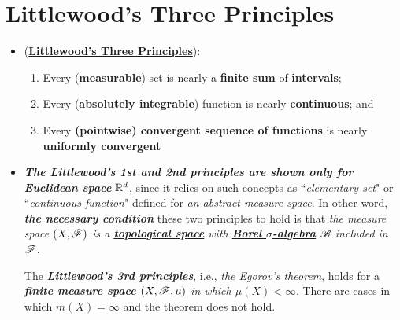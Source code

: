 \documentclass[11pt]{article}
\begin{document}
\newpage
\section{Littlewood's Three Principles}
\begin{itemize}
\item \begin{theorem} (\underline{\textbf{Littlewood's Three Principles}})\citep{royden1988real, tao2011introduction}:
\begin{enumerate}
\item Every (\textbf{measurable}) set is nearly a \textbf{finite sum} of \textbf{intervals};
\item Every (\textbf{absolutely integrable}) function is nearly \textbf{continuous};
and
\item Every \textbf{(pointwise) convergent sequence of functions} is nearly \textbf{uniformly convergent}
\end{enumerate}
\end{theorem}

\item  \begin{remark} \emph{\textbf{The Littlewood's 1st and 2nd principles are shown only for Euclidean space}} ${\mathbb R}^{d}$, since it relies on such  concepts as ``\emph{elementary set}" or ``\emph{continuous function}" defined for \emph{an abstract measure space}. In other word, \emph{\textbf{the necessary condition}} these two principles to hold is that \emph{the measure space $(X, {\mathscr F})$ is a \underline{\textbf{topological space}} with \underline{\textbf{Borel $\sigma$-algebra}} ${\mathscr B}$ included in ${\mathscr F}$}. 

The \emph{\textbf{Littlewood's 3rd principles}}, i.e., \emph{the Egorov's theorem}, holds for a \emph{\textbf{finite measure space} $(X, {\mathscr F}, \mu)$ in which $\mu(X)<\infty$}. There are cases in which $m(X)=\infty$ and the theorem does not hold. \citep{tao2011introduction}
\end{remark}
\end{itemize}
\end{document}
